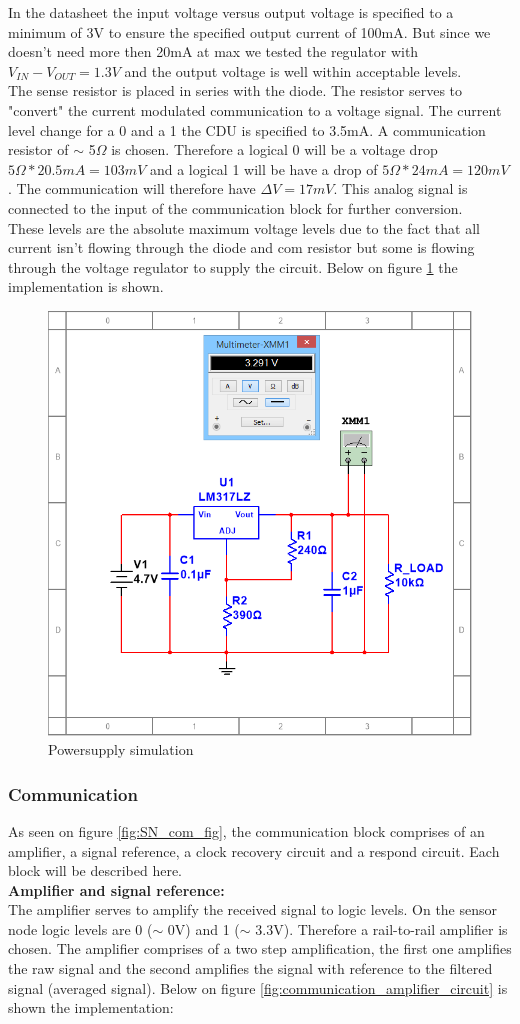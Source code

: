 In the datasheet the input voltage versus output voltage is specified to a minimum of 3V to ensure the specified output current of 100mA. But since we doesn't need more then 20mA at max we tested the regulator with $V_{IN}-V_{OUT}=1.3V$ and the output voltage is well within acceptable levels.\\
The sense resistor is placed in series with the diode. The resistor serves to "convert" the current modulated communication to a voltage signal. The current level change for a 0 and a 1 the CDU is specified to 3.5mA. A communication resistor of $\sim$ 5$\Omega$ is chosen. Therefore a logical 0 will be a voltage drop $5\Omega * 20.5mA = 103mV$ and a logical 1 will be have a drop of $5\Omega * 24mA = 120mV$. The communication will therefore have $\Delta V=17mV$. This analog signal is connected to the input of the communication block for further conversion.\\ These levels are the absolute maximum voltage levels due to the fact that all current isn't flowing through the diode and com resistor but some is flowing through the voltage regulator to supply the circuit. Below on figure \ref{fig:ps_sim} the implementation is shown.

\begin{figure}[H]
	\centering
	\includegraphics[width=.5\textwidth]{billeder/PS_lm317_sim}
	\caption{Powersupply simulation}
	\label{fig:ps_sim}
\end{figure}

\subsubsection{Communication}
\label{sss:com}
As seen on figure \ref{fig:SN_com_fig}, the communication block comprises of an amplifier, a signal reference, a clock recovery circuit and a respond circuit. Each block will be described here.\\
\textbf{Amplifier and signal reference:}\\
The amplifier serves to amplify the received signal to logic levels. On the sensor node logic levels are 0 ($\sim$ 0V) and 1 ($\sim$ 3.3V). Therefore a rail-to-rail amplifier is chosen. The amplifier comprises of a two step amplification, the first one amplifies the raw signal and the second amplifies the signal with reference to the filtered signal (averaged signal). Below on figure \ref{fig:communication_amplifier_circuit} is shown the implementation:

